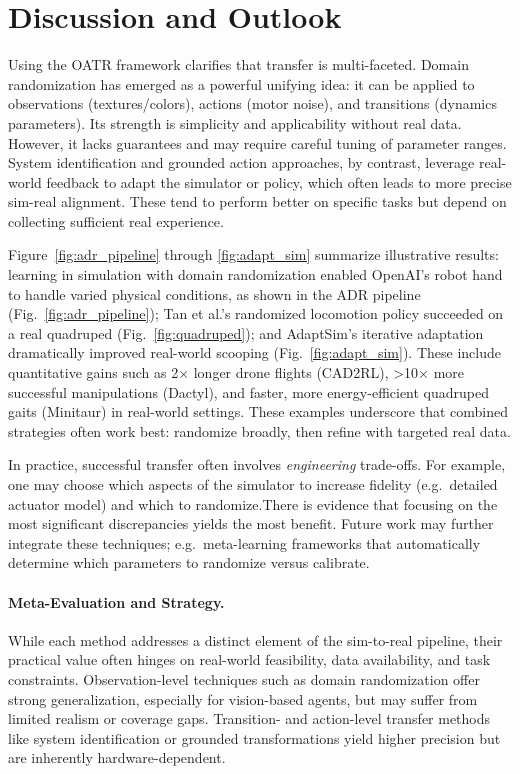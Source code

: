 \section{Discussion and Outlook}
Using the OATR framework clarifies that \simtoreal transfer is multi-faceted. Domain randomization has emerged as a powerful unifying idea: it can be applied to observations (textures/colors), actions (motor noise), and transitions (dynamics parameters). Its strength is simplicity and applicability without real data\cite{Tobin2017,Sadeghi2017,Akkaya2019}. However, it lacks guarantees and may require careful tuning of parameter ranges. System identification and grounded action approaches, by contrast, leverage real-world feedback to adapt the simulator or policy, which often leads to more precise sim-real alignment\cite{Chebotar2019,Hanna2017,Ren2023}. These tend to perform better on specific tasks but depend on collecting sufficient real experience.

Figure~\ref{fig:adr_pipeline} through \ref{fig:adapt_sim} summarize illustrative results: learning in simulation with domain randomization enabled OpenAI’s robot hand to handle varied physical conditions, as shown in the ADR pipeline (Fig.~\ref{fig:adr_pipeline}); Tan et al.’s randomized locomotion policy succeeded on a real quadruped (Fig.~\ref{fig:quadruped}); and AdaptSim’s iterative adaptation dramatically improved real-world scooping (Fig.~\ref{fig:adapt_sim}). These include quantitative gains such as 2× longer drone flights (CAD2RL), >10× more successful manipulations (Dactyl), and faster, more energy-efficient quadruped gaits (Minitaur) in real-world settings. These examples underscore that combined strategies often work best: randomize broadly, then refine with targeted real data.

In practice, successful \simtoreal transfer often involves \emph{engineering} trade-offs. For example, one may choose which aspects of the simulator to increase fidelity (e.g.\ detailed actuator model) and which to randomize.There is evidence that focusing on the most significant discrepancies yields the most benefit. Future work may further integrate these techniques; e.g.\ meta-learning frameworks that automatically determine which parameters to randomize versus calibrate.

\paragraph{Meta-Evaluation and Strategy.}
While each method addresses a distinct element of the sim-to-real pipeline, their practical value often hinges on real-world feasibility, data availability, and task constraints. Observation-level techniques such as domain randomization offer strong generalization, especially for vision-based agents, but may suffer from limited realism or coverage gaps. Transition- and action-level transfer methods like system identification or grounded transformations yield higher precision but are inherently hardware-dependent.

